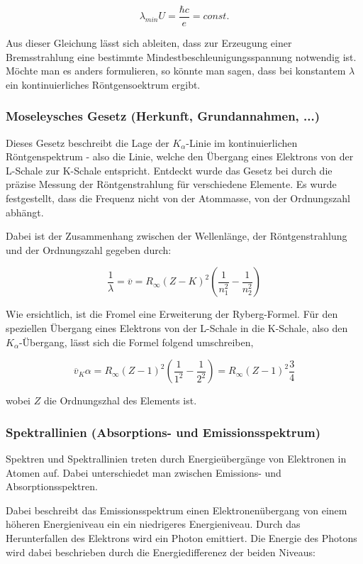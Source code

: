 \documentclass{article}
\begin{document}
    \[
        \lambda_{min}U=\frac{\hbar c}{e}=const.
    \]

    Aus dieser Gleichung lässt sich ableiten, dass zur Erzeugung einer Bremsstrahlung eine bestimmte Mindestbeschleunigungsspannung notwendig ist.  Möchte man es anders formulieren, so könnte man sagen, dass bei konstantem $\lambda$ ein kontinuierliches Röntgensoektrum ergibt.

\subsubsection{Moseleysches Gesetz (Herkunft, Grundannahmen, ...)}

\cite{chemie.de_2}

Dieses Gesetz beschreibt die Lage der $K_\alpha$-Linie im kontinuierlichen Röntgenspektrum - also die Linie, welche den Übergang eines Elektrons von der L-Schale zur K-Schale entspricht. Entdeckt wurde das Gesetz bei durch die präzise Messung der Röntgenstrahlung für verschiedene Elemente. Es wurde festgestellt, dass die Frequenz nicht von der Atommasse, von der Ordnungszahl abhängt.

Dabei ist der Zusammenhang zwischen der Wellenlänge, der Röntgenstrahlung und der Ordnungszahl gegeben durch:

    \[
        \frac{1}{\lambda}=\overline{v}=R_\infty(Z-K)^2(\frac{1}{n_1^2}-\frac{1}{n_2^2})
    \]

Wie ersichtlich, ist die Fromel eine Erweiterung der Ryberg-Formel. Für den speziellen Übergang eines Elektrons von der L-Schale in die K-Schale, also den $K_\alpha$-Übergang, lässt sich die Formel folgend umschreiben,

    \[
        \overline{v}_K\alpha=R_\infty(Z-1)^2(\frac{1}{1^2}-\frac{1}{2^2})=R_\infty(Z-1)^2\frac{3}{4}
    \]

wobei $Z$ die Ordnungszhal des Elements ist.

\subsubsection{Spektrallinien (Absorptions- und Emissionsspektrum)}

\cite{chemie.de_3}

Spektren und Spektrallinien treten durch Energieübergänge von Elektronen in Atomen auf. Dabei unterschiedet man zwischen Emissions- und Absorptionsspektren.

Dabei beschreibt das Emissionsspektrum einen Elektronenübergang von einem höheren Energieniveau ein ein niedrigeres Energieniveau. Durch das Herunterfallen des Elektrons wird ein Photon emittiert. Die Energie des Photons wird dabei beschrieben durch die Energiedifferenez der beiden Niveaus:
\end{document}

